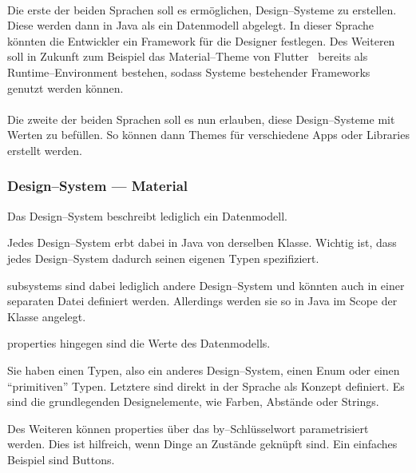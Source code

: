 \paragraph*{}
Die erste der beiden Sprachen soll es ermöglichen, Design--Systeme zu erstellen.
Diese werden dann in Java als ein Datenmodell abgelegt.
In dieser Sprache könnten die Entwickler ein Framework für die Designer festlegen.
Des Weiteren soll in Zukunft zum Beispiel das Material--Theme von Flutter~\autocite{google-ireland-limited-no-date} bereits als Runtime--Environment bestehen, sodass Systeme bestehender Frameworks genutzt werden können.

\paragraph*{}
Die zweite der beiden Sprachen soll es nun erlauben, diese Design--Systeme mit Werten zu befüllen.
So können dann Themes für verschiedene Apps oder Libraries erstellt werden.

\subsubsection{Design--System --- Material}
Das Design--System beschreibt lediglich ein Datenmodell.

Jedes {\ttfamily Design--System} erbt dabei in Java von derselben Klasse.
Wichtig ist, dass jedes {\ttfamily Design--System} dadurch seinen eigenen Typen spezifiziert.

{\ttfamily subsystems} sind dabei lediglich andere {\ttfamily Design--System} und könnten auch in einer separaten Datei definiert werden.
Allerdings werden sie so in Java im Scope der Klasse angelegt.

{\ttfamily properties} hingegen sind die Werte des Datenmodells.

Sie haben einen Typen, also ein anderes {\ttfamily Design--System}, einen {\ttfamily Enum} oder einen \enquote{primitiven} Typen.
Letztere sind direkt in der Sprache als Konzept definiert.
Es sind die grundlegenden Designelemente, wie Farben, Abstände oder Strings.

Des Weiteren können {\ttfamily properties} über das {\ttfamily by}--Schlüsselwort parametrisiert werden.
Dies ist hilfreich, wenn Dinge an Zustände geknüpft sind.
Ein einfaches Beispiel sind Buttons.

